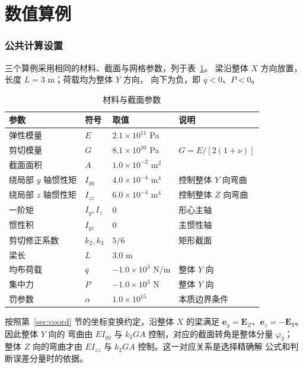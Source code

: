 \documentclass[UTF8,a4paper,11pt]{ctexart}
\begin{document}
\part{数值算例}

\section{公共计算设置}

三个算例采用相同的材料、截面与网格参数，列于表~\ref{tab:params}。
梁沿整体 $X$ 方向放置，长度 $L=3$ m；荷载均为整体 $Y$ 方向，
向下为负，即 $q<0$、$P<0$。

\begin{table}[H]
\centering
\caption{材料与截面参数}
\label{tab:params}
\begin{tabular}{llll}
\toprule
参数 & 符号 & 取值 & 说明\\
\midrule
弹性模量 & $E$ & $2.1\times10^{11}$ Pa & \\
剪切模量 & $G$ & $8.1\times10^{10}$ Pa & $G=E/[2(1+\nu)]$\\
截面面积 & $A$ & $1.0\times10^{-2}$ m$^2$ & \\
绕局部 $y$ 轴惯性矩 & $I_{yy}$ & $4.0\times10^{-4}$ m$^4$ & 控制整体 $Y$ 向弯曲\\
绕局部 $z$ 轴惯性矩 & $I_{zz}$ & $6.0\times10^{-4}$ m$^4$ & 控制整体 $Z$ 向弯曲\\
一阶矩 & $I_y,I_z$ & $0$ & 形心主轴\\
惯性积 & $I_{yz}$ & $0$ & 主惯性轴\\
剪切修正系数 & $k_2,k_3$ & $5/6$ & 矩形截面\\
梁长 & $L$ & $3.0$ m & \\
均布荷载 & $q$ & $-1.0\times10^{3}$ N/m & 整体 $Y$ 向\\
集中力 & $P$ & $-1.0\times10^{3}$ N & 整体 $Y$ 向\\
罚参数 & $\alpha$ & $1.0\times10^{15}$ & 本质边界条件\\
\bottomrule
\end{tabular}
\end{table}

按照第~\ref{sec:coord} 节的坐标变换约定，沿整体 $X$ 的梁满足
$\mathbf{e}_y=\mathbf{E}_Z$、$\mathbf{e}_z=-\mathbf{E}_Y$。因此整体 $Y$ 向的
弯曲由 $EI_{yy}$ 与 $k_3GA$ 控制，对应的截面转角是整体分量 $\varphi_3$；
整体 $Z$ 向的弯曲才由 $EI_{zz}$ 与 $k_2GA$ 控制。这一对应关系是选择精确解
公式和判断误差分量时的依据。
\end{document}
